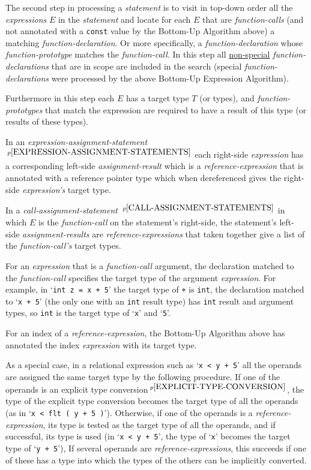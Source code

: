 \documentclass[12pt]{article}
\newcommand{\pagnote}[1]{$\,^{p\pageref{#1}}$}
\begin{document}
The second step in processing a {\em statement} is to visit in top-down order
all the {\em expressions} $E$ in the {\em statement}
and locate for each $E$ that are {\em function-calls}
(and not annotated with a {\tt const} value by the Bottom-Up Algorithm above)
a matching {\em function-declaration}.  Or more specifically,
a {\em function-declaration} whose {\em function-prototype} matches
the {\em function-call}.  In this step all \underline{non-special}
{\em function-declarations} that are in scope are included in the search
(special {\em function-declarations} were processed by the above
Bottom-Up Expression Algorithm).

Furthermore in this step each $E$ has a target type $T$ (or types),
and {\em function-prototypes} that match the expression are required to
have a result of this type (or results of these types).

In an {\em expression-assignment-statement}%
\pagnote{EXPRESSION-ASSIGNMENT-STATEMENTS} each right-side {\em expression}
has a corresponding left-side {\em assignment-result} which is a
{\em reference-expression} that is annotated with a reference pointer type
which when dereferenced gives the right-side {\em expression's} target type.

In a {\em call-assignment-statement}%
\pagnote{CALL-ASSIGNMENT-STATEMENTS} in which $E$ is the {\em function-call}
on the statement's right-side, the statement's
left-side {\em assignment-results} are {\em reference-expressions} that
taken together give a list of the {\em function-call's} target types.

For an {\em expression} that is a {\em function-call} argument,
the declaration matched to the {\em function-call} specifies the
target type of the argument {\em expression}.  For example, in
`{\tt int z = x + 5}' the target type of {\tt +} is {\tt int},
the declaration matched to `{\tt x +  5}' (the only one with an {\tt int}
result type) has {\tt int} result
and argument types, so {\tt int} is the target type of `{\tt x}' and `{\tt 5}'.

For an index of a {\em reference-expression}, the Bottom-Up 
Algorithm above has annotated the index {\em expression} with its target type.

As a special case, in a relational expression such as `{\tt x < y + 5}'
all the operands are assigned the same target type by the following
procedure.
If one of the operands is
an explicit type conversion\pagnote{EXPLICIT-TYPE-CONVERSION},
the type of the explicit type conversion
becomes the target type of all the operands
(as in `{\tt x < flt ( y + 5 )}').
Otherwise, if
one of the operands is a {\em reference-expression},
its type is tested as the target type of all the operands,
and if successful, its type is used
(in `{\tt x < y + 5}',
the type of `{\tt x}' becomes the target type of `{\tt y + 5}'),
If several operands are {\em reference-expressions}, this succeeds if
one of these has a type into which the types of the others can be
implicitly converted.
\end{document}
